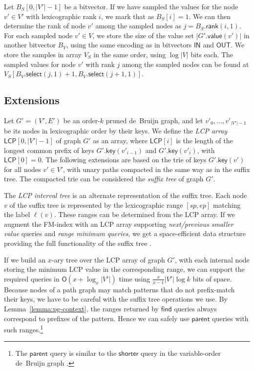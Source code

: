 \documentclass[a4paper,UKenglish]{lipics-v2016}
\newcommand{\abs}[1]{\ensuremath{\lvert #1 \rvert}}
\newcommand{\Oh}[1]{\ensuremath{\mathsf{O}\!\left( #1 \right)}}
\newcommand{\rank}{\ensuremath{\mathsf{rank}}}
\newcommand{\select}{\ensuremath{\mathsf{select}}}
\newcommand{\find}{\ensuremath{\mathsf{find}}}
\newcommand{\parent}{\ensuremath{\mathsf{parent}}}
\newcommand{\gkey}{\ensuremath{\mathsf{key}}}
\newcommand{\gvalue}{\ensuremath{\mathsf{value}}}
\newcommand{\orderk}[1]{order\nobreakdash-$#1$}
\newcommand{\LCP}{\ensuremath{\mathsf{LCP}}}
\newcommand{\bvIN}{\ensuremath{\mathsf{IN}}}
\newcommand{\bvOUT}{\ensuremath{\mathsf{OUT}}}
\begin{document}
Let $B_{S}[0, \abs{V'}-1]$ be a bitvector. If we have sampled the values for the node $v' \in V'$ with lexicographic rank $i$, we mark that as $B_{S}[i] = 1$. We can then determine the rank of node $v'$ among the sampled nodes as $j = B_{S}.\rank(i, 1)$. For each sampled node $v' \in V$, we store the size of the value set $\abs{G'.\gvalue(v')}$ in another bitvector $B_{V}$, using the same encoding as in bitvectors $\bvIN$ and $\bvOUT$. We store the samples in array $V_{S}$ in the same order, using $\log \abs{V}$ bits each. The sampled values for node $v'$ with rank $j$ among the sampled nodes can be found at $V_{S}[B_{V}.\select(j, 1) + 1, B_{V}.\select(j+1, 1)]$.

\subsection{Extensions}

Let $G' = (V', E')$ be an \orderk{k} pruned de~Bruijn graph, and let $v'_{0}, \dotsc, v'_{\abs{V'}-1}$ be its nodes in lexicographic order by their keys. We define the \emph{LCP array} $\LCP[0, \abs{V'}-1]$ of graph $G'$ as an array, where $\LCP[i]$ is the length of the longest common prefix of keys $G'.\gkey(v'_{i-1})$ and $G'.\gkey(v'_{i})$, with $\LCP[0] = 0$. The following extensions are based on the trie of keys $G'.\gkey(v')$ for all nodes $v' \in V'$, with unary paths compacted in the same way as in the suffix tree. The compacted trie can be considered the \emph{suffix tree} of graph $G'$.

The \emph{LCP interval tree} \cite{Abouelhoda2004} is an alternate representation of the suffix tree. Each node $v$ of the suffix tree is represented by the lexicographic range $[sp, ep]$ matching the label $\ell(v)$. These ranges can be determined from the LCP array. If we augment the FM\nobreakdash-index with an LCP array supporting \emph{next/previous smaller value} queries and \emph{range minimum queries}, we get a space-efficient data structure providing the full functionality of the suffix tree \cite{Fischer2009a}.

If we build an $x$\nobreakdash-ary tree over the LCP array of graph $G'$, with each internal node storing the minimum LCP value in the corresponding range, we can support the required queries in $\Oh{x + \log_{x} \abs{V'}}$ time using $\frac{x}{x-1} \abs{V'} \log k$ bits of space. Because nodes of a path graph may match patterns that do not prefix-match their keys, we have to be careful with the suffix tree operations we use. By Lemma~\ref{lemma:pg-context}, the ranges returned by $\find$ queries always correspond to prefixes of the pattern. Hence we can safely use $\parent$ queries with such ranges.\footnote{The $\parent$ query is similar to the $\textsf{shorter}$ query in the variable-order de~Bruijn graph \cite{Boucher2014}.}
\end{document}
